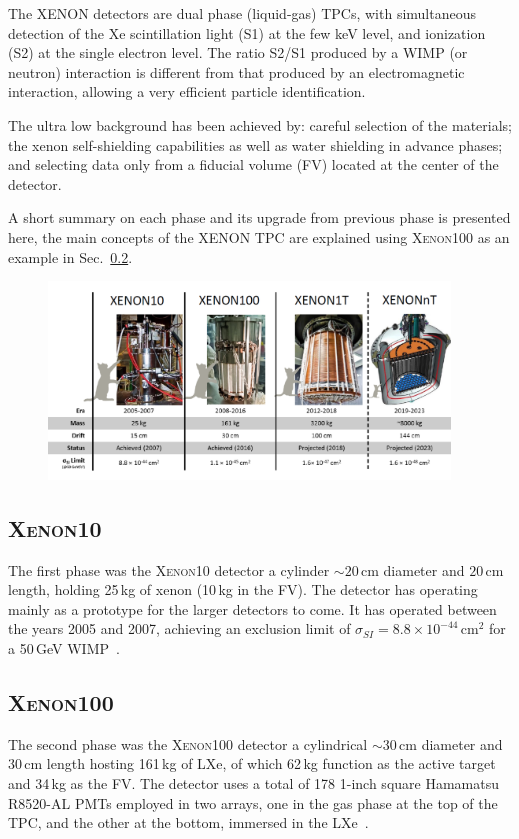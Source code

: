 The XENON detectors are dual phase (liquid-gas) TPCs, with simultaneous
detection of the Xe scintillation light (S1) at the few keV level, and ionization (S2) at the single electron level. The ratio S2/S1 produced by a WIMP (or neutron) interaction is different from that produced by an electromagnetic interaction, allowing a very efficient particle identification.

The ultra low background has been achieved by: careful selection of the materials; the xenon self-shielding capabilities as well as water shielding in advance phases; and selecting data only from a fiducial volume (FV) located at the center of the detector.

A short summary on each phase and its upgrade from previous phase is presented here, the main concepts of the XENON TPC are explained using \textsc{Xenon100} as an example in Sec.~\ref{sec:xe100}.


\begin{figure}[t!]
	\centering
	\includegraphics[width=0.95\textwidth]{figs/XePhases.png}
	\label{fig:XenonProg}
\end{figure}


\subsection{\textsc{Xenon10}}
\label{sec:xe10}
The first phase was the \textsc{Xenon10} detector a cylinder $\sim 20$\,cm diameter and $20$\,cm length, holding 25\,kg of xenon (10\,kg in the FV). The detector has operating mainly as a prototype for the larger detectors to come. It has operated between the years 2005 and 2007, achieving an exclusion limit of $\sigma_{SI} = 8.8 \times 10^{-44}$\,cm$^2$ for a 50\,GeV WIMP~\cite{Angle:2007uj}.

\subsection{\textsc{Xenon100}}
\label{sec:xe100}
The second phase was the \textsc{Xenon100} detector a cylindrical $\sim 30$\,cm diameter and $30$\,cm length hosting 161\,kg of LXe, of which 62\,kg function as the active target and 34\,kg as the FV. The detector uses a total of 178 1-inch square Hamamatsu R8520-AL PMTs employed in two arrays, one in the gas phase at the top of the TPC, and the other at the bottom, immersed in the LXe~\cite{xe100_instr2012}.

